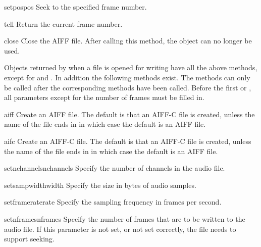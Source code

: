 \begin{funcdesc}{setpos}{pos}
Seek to the specified frame number.
\end{funcdesc}

\begin{funcdesc}{tell}{}
Return the current frame number.
\end{funcdesc}

\begin{funcdesc}{close}{}
Close the AIFF file.  After calling this method, the object can no
longer be used.
\end{funcdesc}

Objects returned by  when a file is opened for
writing have all the above methods, except for  and
.  In addition the following methods exist.  The
 methods can only be called after the corresponding
 methods have been called.  Before the first
 or , all parameters except
for the number of frames must be filled in.

\begin{funcdesc}{aiff}{}
Create an AIFF file.  The default is that an AIFF-C file is created,
unless the name of the file ends in  in which case the
default is an AIFF file.
\end{funcdesc}

\begin{funcdesc}{aifc}{}
Create an AIFF-C file.  The default is that an AIFF-C file is created,
unless the name of the file ends in  in which case the
default is an AIFF file.
\end{funcdesc}

\begin{funcdesc}{setnchannels}{nchannels}
Specify the number of channels in the audio file.
\end{funcdesc}

\begin{funcdesc}{setsampwidth}{width}
Specify the size in bytes of audio samples.
\end{funcdesc}

\begin{funcdesc}{setframerate}{rate}
Specify the sampling frequency in frames per second.
\end{funcdesc}

\begin{funcdesc}{setnframes}{nframes}
Specify the number of frames that are to be written to the audio file.
If this parameter is not set, or not set correctly, the file needs to
support seeking.
\end{funcdesc}

